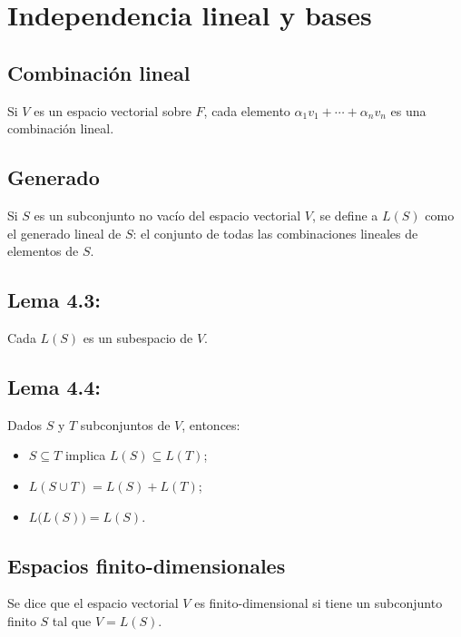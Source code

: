 \documentclass{article}
\begin{document}
\newpage
\section{Independencia lineal y bases}

\subsection*{\color{violet} Combinación lineal}

Si $V$ es un espacio vectorial sobre $F$, cada elemento $\alpha_1v_1+\cdots+\alpha_nv_n$ es una combinación lineal.
 
\subsection*{\color{violet} Generado}

Si $S$ es un subconjunto no vacío del espacio vectorial $V$, se define a $L(S)$ como el generado lineal de $S$: el conjunto de todas las combinaciones lineales de elementos de $S$.

\subsection*{\color{blue} Lema 4.3:}

Cada $L(S)$ es un subespacio de $V$.

\subsection*{\color{blue} Lema 4.4:}

Dados $S$ y $T$ subconjuntos de $V$, entonces:
\begin{itemize}

\item $S\subseteq T$ implica $L(S)\subseteq L(T)$;

\item $L(S\cup T)=L(S)+L(T)$;

\item $L\big(L(S)\big)=L(S)$.

\end{itemize}

\subsection*{\color{violet} Espacios finito-dimensionales}

Se dice que el espacio vectorial $V$ es finito-dimensional si tiene un subconjunto finito $S$ tal que $V=L(S)$.
\end{document}
